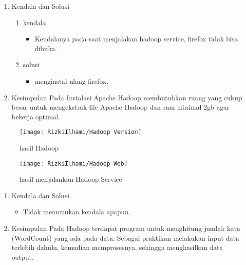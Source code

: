 

\begin{enumerate}

\item Kendala dan Solusi
\begin{enumerate}
    \item kendala
\begin{itemize}
    \item Kendalanya pada saat menjalakan hadoop service, firefox tidak bisa dibuka.
\end{itemize}
    \item solusi
\begin{itemize}
    \item menginstal ulang firefox.
\end{itemize}
\end{enumerate}

\item Kesimpulan
\newline
    Pada Instalasi Apache Hadoop membutuhkan ruang yang
    cukup besar untuk mengekstrak file Apache Hadoop dan ram
    minimal 2gb agar bekerja optimal.


\end{enumerate}

\begin{figure}[!ht]
    \texttt{[image: RizkiIlhami/Hadoop Version]}
    \caption{hasil Hadoop}
    \label{gam:Hasil}
\end{figure}

\begin{figure}[!ht]
    \texttt{[image: RizkiIlhami/Hadoop Web]}
    \caption{hasil menjalankan Hadoop Service}
    \label{gam:Hasil}
\end{figure}


\begin{enumerate}
\item Kendala dan Solusi

\begin{itemize}
\item Tidak menumukan kendala apapun.
\end{itemize}

\item Kesimpulan
\newline
    Pada Hadoop terdapat program untuk menghitung jumlah kata 
    (WordCount) yang ada pada data. Sebagai praktikan melakukan input data terlebih
    dahulu, kemudian memprosesnya, sehingga menghasilkan data output.

\end{enumerate}

